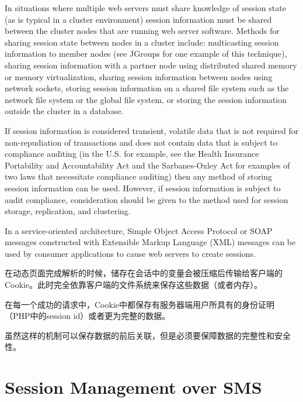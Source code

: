 In situations where multiple web servers must share knowledge of session state (as is typical in a cluster environment) session information must be shared between the cluster nodes that are running web server software. Methods for sharing session state between nodes in a cluster include: multicasting session information to member nodes (see JGroups for one example of this technique), sharing session information with a partner node using distributed shared memory or memory virtualization, sharing session information between nodes using network sockets, storing session information on a shared file system such as the network file system or the global file system, or storing the session information outside the cluster in a database.

If session information is considered transient, volatile data that is not required for non-repudiation of transactions and does not contain data that is subject to compliance auditing (in the U.S. for example, see the Health Insurance Portability and Accountability Act and the Sarbanes-Oxley Act for examples of two laws that necessitate compliance auditing) then any method of storing session information can be used. However, if session information is subject to audit compliance, consideration should be given to the method used for session storage, replication, and clustering.

In a service-oriented architecture, Simple Object Access Protocol or SOAP messages constructed with Extensible Markup Language (XML) messages can be used by consumer applications to cause web servers to create sessions.


在动态页面完成解析的时候，储存在会话中的变量会被压缩后传输给客户端的Cookie。此时完全依靠客户端的文件系统来保存这些数据（或者内存）。

在每一个成功的请求中，Cookie中都保存有服务器端用户所具有的身份证明（PHP中的session id）或者更为完整的数据。

虽然这样的机制可以保存数据的前后关联，但是必须要保障数据的完整性和安全性。



\section{Session Management over SMS}


